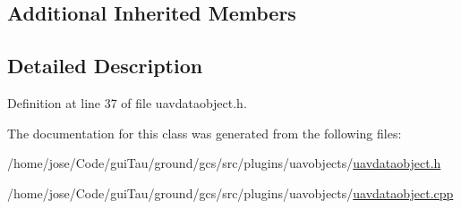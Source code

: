 \subsection*{Additional Inherited Members}


\subsection{Detailed Description}


Definition at line 37 of file uavdataobject.\-h.



The documentation for this class was generated from the following files\-:\begin{DoxyCompactItemize}
\item 
/home/jose/\-Code/gui\-Tau/ground/gcs/src/plugins/uavobjects/\hyperlink{uavdataobject_8h}{uavdataobject.\-h}\item 
/home/jose/\-Code/gui\-Tau/ground/gcs/src/plugins/uavobjects/\hyperlink{uavdataobject_8cpp}{uavdataobject.\-cpp}\end{DoxyCompactItemize}
